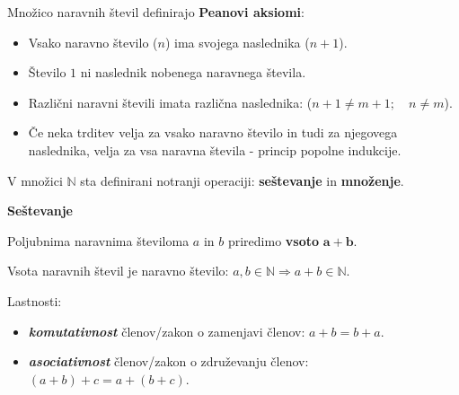        \begin{frame}
            Množico naravnih števil definirajo \textbf{Peanovi aksiomi}:
            \begin{itemize}
                \item Vsako naravno število ($n$) ima svojega naslednika ($n+1$).
                \item Število $1$ ni naslednik nobenega naravnega števila.
                \item Različni naravni števili imata različna naslednika: ($n+1 \neq m+1;\quad n \neq m$).
                \item Če neka trditev velja za vsako naravno število in tudi za njegovega naslednika, velja za vsa naravna števila - princip popolne indukcije.
            \end{itemize}
            
            \bigskip
            V množici $\mathbb{N}$ sta definirani notranji operaciji: \textbf{seštevanje} in \textbf{množenje}.
        \end{frame}

        \begin{frame}
            \textbf{\large{Seštevanje}}
            
            \bigskip
            Poljubnima naravnima številoma $a$ in $b$ priredimo \textbf{vsoto} $\mathbf{a+b}$.
            
            \bigskip
            Vsota naravnih števil je naravno število: $a, b \in \mathbb{N} \Rightarrow a+b \in \mathbb{N}$.
            
            \bigskip
            Lastnosti:
            \begin{itemize}
                \item \textit{\textbf{komutativnost}} členov/zakon o zamenjavi členov: $a+b = b+a$.
                \item \textit{\textbf{asociativnost}} členov/zakon o združevanju členov: $(a+b)+c = a+(b+c)$.
            \end{itemize}

        \end{frame}

